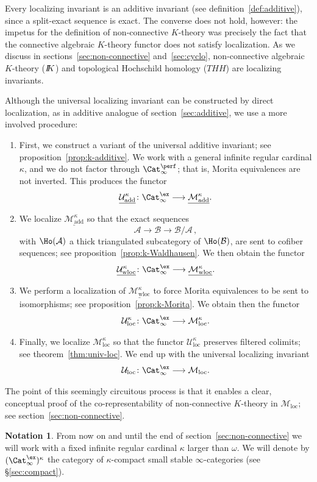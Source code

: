 \documentclass{amsart}
\renewcommand{\to}{\mathchoice{\longrightarrow}{\rightarrow}{\rightarrow}{\rightarrow}}
\newcommand{\cA}{{\mathcal A}}
\newcommand{\cB}{{\mathcal B}}
\newcommand{\cM}{{\mathcal M}}
\newcommand{\cU}{{\mathcal U}}
\newcommand{\bbK}{I\mspace{-6.mu}K}
\newcommand{\stabcat}{\Cat_\i^{\ex}}
\newcommand{\idemstabcat}{\Cat_\i^{\perf}}
\newcommand{\too}{\longrightarrow}%
\renewcommand{\i}{\infty}
\newcommand{\uMotadd}{\underline{\cM_{\mathrm{add}}^\kappa}}
\newcommand{\uwMotloc}{\underline{\cM_{\mathrm{wloc}}^\kappa}}
\newcommand{\wMotloc}{\cM_{\mathrm{loc}}^\kappa}
\newcommand{\Motloc}{\cM_\mathrm{loc}}
\newcommand{\uUmot}{\underline{\cU_{\mathrm{add}}^\kappa}}
\newcommand{\uwUloc}{\underline{\cU_{\mathrm{wloc}}^\kappa}}
\newcommand{\wUloc}{\cU_{\mathrm{loc}}^\kappa}
\newcommand{\Uloc}{\cU_{\mathrm{loc}}}
\numberwithin{equation}{section}
\theoremstyle{definition}
\newtheorem{notation}[equation]{Notation}
\begin{document}
Every localizing invariant is an additive invariant (see
definition~\ref{def:additive}), since a split-exact sequence is exact.
The converse does not hold, however: the impetus for the definition of
non-connective $K$-theory was precisely the fact that the connective
algebraic $K$-theory functor does not satisfy localization.  As we
discuss in sections~\ref{sec:non-connective} and~\ref{sec:cyclo},
non-connective algebraic $K$-theory ($\bbK$) and topological Hochschild
homology ($THH$) are localizing invariants.

Although the universal localizing invariant can be constructed by direct
localization, as in additive analogue of section~\ref{sec:additive}, we use a more involved procedure:

\begin{enumerate}
\item First, we construct a variant of the universal additive
invariant; see proposition~\ref{prop:k-additive}.  We work with a
general infinite regular cardinal $\kappa$, and we do not factor
through $\idemstabcat$; that is, Morita equivalences are not
inverted.  This produces the functor
\[
\uUmot\colon \stabcat \to \uMotadd.
\]

\item We localize $\uMotadd$ so that the exact sequences
$$ \cA \too \cB \too \cB/\cA\,,$$
with $\Ho(\cA)$ a thick triangulated subcategory of $\Ho(\cB)$, are sent
to cofiber sequences; see proposition~\ref{prop:k-Waldhausen}.  We
then obtain the functor 
\[
\uwUloc\colon \stabcat \to \uwMotloc.
\]

\item We perform a localization of $\uwMotloc$ to force Morita
equivalences to be sent to isomorphisms; see
proposition~\ref{prop:k-Morita}. We obtain then the functor
\[
\wUloc\colon \stabcat \to \wMotloc.
\]

\item Finally, we localize $\wMotloc$ so that the functor
$\wUloc$ preserves filtered colimits; see
theorem~\ref{thm:univ-loc}.  We end up with the universal localizing
invariant 
\[
\Uloc\colon \stabcat \to \Motloc.
\]
\end{enumerate}
The point of this seemingly circuitous process is that it enables
a clear, conceptual proof of the co-representability of
non-connective $K$-theory in $\Motloc$; see
section~\ref{sec:non-connective}.

\begin{notation}\label{not:important}
From now on and until the end of section~\ref{sec:non-connective} we
will work with a fixed infinite regular cardinal $\kappa$ larger than
$\omega$. We will denote by $(\stabcat)^\kappa$ the category of
$\kappa$-compact small stable $\i$-categories (see \S\ref{sec:compact}).

\end{notation}
\end{document}
